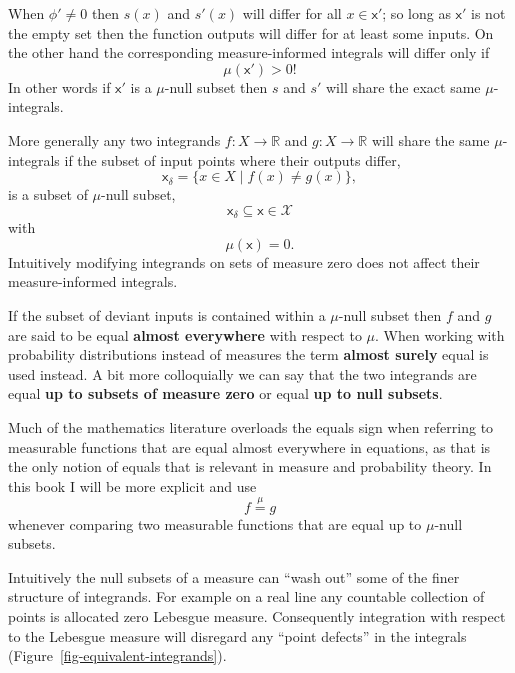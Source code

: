 \documentclass[
  letterpaper,
  DIV=11,
  numbers=noendperiod]{scrartcl}
\begin{document}
When \(\phi' \ne 0\) then \(s(x)\) and \(s'(x)\) will differ for all
\(x \in \mathsf{x}'\); so long as \(\mathsf{x}'\) is not the empty set
then the function outputs will differ for at least some inputs. On the
other hand the corresponding measure-informed integrals will differ only
if \[
\mu(\mathsf{x}') > 0!
\] In other words if \(\mathsf{x}'\) is a \(\mu\)-null subset then \(s\)
and \(s'\) will share the exact same \(\mu\)-integrals.

More generally any two integrands \(f: X \rightarrow \mathbb{R}\) and
\(g: X \rightarrow \mathbb{R}\) will share the same \(\mu\)-integrals if
the subset of input points where their outputs differ, \[
\mathsf{x}_{\delta} = \{ x \in X \mid f(x) \ne g(x) \},
\] is a subset of \(\mu\)-null subset, \[
\mathsf{x}_{\delta} \subseteq \mathsf{x} \in \mathcal{X}
\] with \[
\mu(\mathsf{x}) = 0.
\] Intuitively modifying integrands on sets of measure zero does not
affect their measure-informed integrals.

If the subset of deviant inputs is contained within a \(\mu\)-null
subset then \(f\) and \(g\) are said to be equal \textbf{almost
everywhere} with respect to \(\mu\). When working with probability
distributions instead of measures the term \textbf{almost surely} equal
is used instead. A bit more colloquially we can say that the two
integrands are equal \textbf{up to subsets of measure zero} or equal
\textbf{up to null subsets}.

Much of the mathematics literature overloads the equals sign when
referring to measurable functions that are equal almost everywhere in
equations, as that is the only notion of equals that is relevant in
measure and probability theory. In this book I will be more explicit and
use \[
f \overset{\mu}{=} g
\] whenever comparing two measurable functions that are equal up to
\(\mu\)-null subsets.

Intuitively the null subsets of a measure can ``wash out'' some of the
finer structure of integrands. For example on a real line any countable
collection of points is allocated zero Lebesgue measure. Consequently
integration with respect to the Lebesgue measure will disregard any
``point defects'' in the integrals
(Figure~\ref{fig-equivalent-integrands}).
\end{document}
